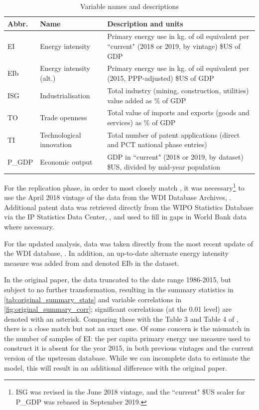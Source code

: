 \documentclass[11pt]{article}
\begin{document}
\begin{table}[htbp]
\centering
\begin{tabulary}{\textwidth}{l l L} 
 \toprule 
 Abbr. & Name & Description and units \\ [1ex] 
 \midrule 
 EI & Energy intensity & Primary energy use in kg. of oil equivalent per ``current" (2018 or 2019, by vintage) \$US of GDP \\ 
 EIb & Energy intensity (alt.) & Primary energy use in kg. of oil equivalent per (2015, PPP-adjusted) \$US of GDP \\ 
 ISG & Industrialisation & Total industry (mining, construction, utilities) value added as \% of GDP \\
 TO & Trade openness & Total value of imports and exports (goods and services) as \% of GDP \\ 
 TI & Technological innovation & Total number of patent applications (direct and PCT national phase entries) \\ 
 P\_GDP & Economic output & GDP in ``current" (2018 or 2019, by dataset) \$US, divided by mid-year population \\ 
 \bottomrule 
\end{tabulary}
\caption{Variable names and descriptions}
\label{tab:data_source}
\end{table}

For the replication phase, in order to most closely match \cite{panHowIndustrializationTrade2019}, it was necessary\footnote{
ISG was revised in the June 2018 vintage, and the ``current" \$US scaler for P\_GDP was rebased in September 2019.
} to use the April 2018 vintage of the data from the WDI Database Archives, \cite{theworldbankWDIDatabaseArchives2018}.
Additional patent data was retrieved directly from the WIPO Statistics Database via the IP Statistics Data Center, \cite{wipoWIPOStatisticsDatabase2020}, and used to fill in gaps in World Bank data where necessary.

For the updated analysis, data was taken directly from the most recent update of the WDI database, \cite{theworldbankWorldDevelopmentIndicators2019}. In addition, an up-to-date alternate energy intensity measure was added from \cite{enerdataGlobalEnergyStatistical2019} and denoted EIb in the dataset.

In the original paper, the data truncated to the date range 1986-2015, but subject to no further transformation, resulting in the summary statistics in \cref{tab:original_summary_stats} and variable correlations in \cref{fig:original_summary_corr};
significant correlations (at the 0.01 level) are denoted with an asterisk.
Comparing these with the Table 3 and Table 4 of \cite{panHowIndustrializationTrade2019}, there is a close match but not an exact one.
Of some concern is the mismatch in the number of samples of EI: the per capita primary energy use measure used to construct it is absent for the year 2015, in both previous vintages and the current version of the upstream database.
While we can incomplete data to estimate the model, this will result in an additional difference with the original paper.
\end{document}
